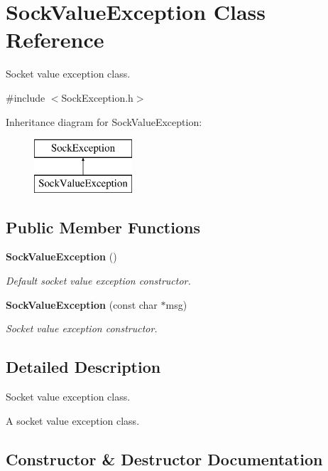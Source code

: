 \section{\-Sock\-Value\-Exception \-Class \-Reference}
\label{classSockValueException}


\-Socket value exception class.  




{\ttfamily \#include $<$\-Sock\-Exception.\-h$>$}

\-Inheritance diagram for \-Sock\-Value\-Exception\-:\begin{figure}[H]
\begin{center}
\leavevmode
\includegraphics[height=2.000000cm]{classSockValueException}
\end{center}
\end{figure}
\subsection*{\-Public \-Member \-Functions}
\begin{DoxyCompactItemize}
\item 
{\bf \-Sock\-Value\-Exception} ()
\begin{DoxyCompactList}\small\item\em \-Default socket value exception constructor. \end{DoxyCompactList}\item 
{\bf \-Sock\-Value\-Exception} (const char $\ast$msg)
\begin{DoxyCompactList}\small\item\em \-Socket value exception constructor. \end{DoxyCompactList}\end{DoxyCompactItemize}


\subsection{\-Detailed \-Description}
\-Socket value exception class. 

\-A socket value exception class. 

\subsection{\-Constructor \& \-Destructor \-Documentation}
